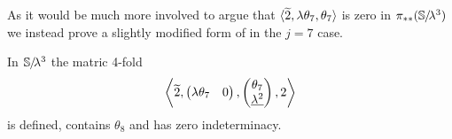 As it would be much more involved to argue that $\langle \wt{2}, \lambda \theta_7, \theta_7 \rangle$ is zero in $\pi_{**}(\operatorname{\mathbb{S}}\hspace{-2.2pt}/\!\lambda^3)$ we instead prove a slightly modified form of  in the $j=7$ case.


\begin{lem} \label{lem:theta-8-4-fold}
  In $\operatorname{\mathbb{S}}\hspace{-2.2pt}/\!\lambda^3$ the matric 4-fold
  \[ \left\langle \wt{2}, \begin{pmatrix} \lambda \theta_7 & 0 \end{pmatrix}, \begin{pmatrix} \theta_7 \\ \underline{\lambda^2} \end{pmatrix}, 2 \right\rangle \]
  is defined, contains $\theta_{8}$ and has zero indeterminacy.
\end{lem}


